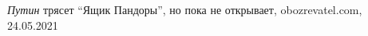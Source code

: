  
 
 
 
 
\emph{Путин} трясет \enquote{Ящик Пандоры}, но пока не открывает,
obozrevatel.com, 24.05.2021
